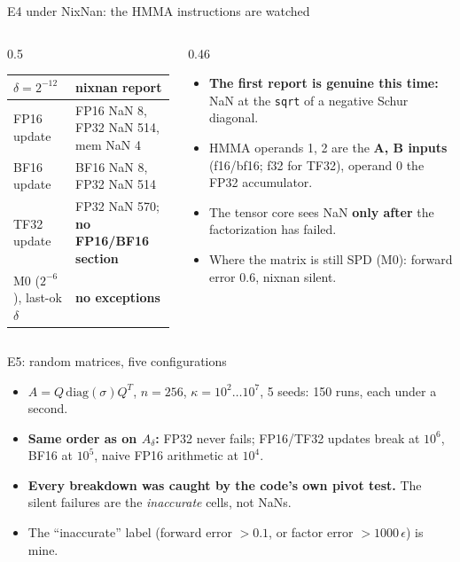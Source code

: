 \documentclass[aspectratio=169,10pt,xcolor=table]{beamer}
\begin{document}
\begin{frame}{E4 under NixNan: the HMMA instructions are watched}
\vspace{2mm}\footnotesize
\begin{columns}[T]\begin{column}{0.5\textwidth}
\begin{tabular}{lp{4.2cm}}
\toprule
$\delta=2^{-12}$ & nixnan report\\
\midrule
FP16 update & FP16 NaN 8, FP32 NaN 514, mem NaN 4\\
BF16 update & BF16 NaN 8, FP32 NaN 514\\
TF32 update & FP32 NaN 570; \textbf{no FP16/BF16 section}\\
M0 ($2^{-6}$), last-ok $\delta$ & \textbf{no exceptions}\\
\bottomrule
\end{tabular}
\end{column}\begin{column}{0.46\textwidth}
\begin{itemize}
\item \textbf{The first report is genuine this time:} NaN at the \texttt{sqrt} of a negative Schur diagonal.
\item HMMA operands 1, 2 are the \textbf{A, B inputs} (f16/bf16; f32 for TF32), operand 0 the FP32 accumulator.
\item The tensor core sees NaN \textbf{only after} the factorization has failed.
\item Where the matrix is still SPD (M0): forward error 0.6, nixnan silent.
\end{itemize}
\end{column}\end{columns}
\end{frame}

\begin{frame}{E5: random matrices, five configurations}
\centering\scriptsize


\vspace{2mm}\raggedright\footnotesize
\begin{itemize}
\item $A=Q\,\mathrm{diag}(\sigma)Q^T$, $n=256$, $\kappa=10^{2}\ldots10^{7}$, 5 seeds: 150 runs, each under a second.
\item \textbf{Same order as on $A_\delta$:} FP32 never fails; FP16/TF32 updates break at $10^{6}$, BF16 at $10^{5}$, naive FP16 arithmetic at $10^{4}$.
\item \textbf{Every breakdown was caught by the code's own pivot test.} The silent failures are the \textit{inaccurate} cells, not NaNs.
\item The ``inaccurate'' label (forward error $>0.1$, or factor error $>1000\,\epsilon$) is mine.
\end{itemize}
\end{frame}
\end{document}
